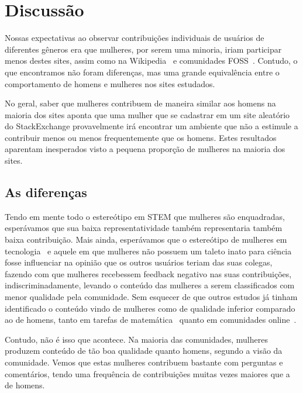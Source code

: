 \chapter{Discussão}

Nossas expectativas ao observar contribuições individuais de usuários de diferentes gêneros era que mulheres, por serem uma minoria, iriam participar menos destes sites, assim como na Wikipedia~\cite{antin2011gender} e comunidades FOSS~\cite{rustad2011suck}. Contudo, o que encontramos não foram diferenças, mas uma grande equivalência entre o comportamento de homens e mulheres nos sites estudados. 

No geral, saber que mulheres contribuem de maneira similar aos homens na maioria dos sites aponta que uma mulher que se cadastrar em um site aleatório do StackExchange provavelmente irá encontrar um ambiente que não a estimule a contribuir menos ou menos frequentemente que os homens. Estes resultados aparentam inesperados visto a pequena proporção de mulheres na maioria dos sites.

\section{As diferenças}

Tendo em mente todo o estereótipo em STEM que mulheres são enquadradas, esperávamos que sua baixa representatividade também representaria também baixa contribuição. Mais ainda, esperávamos que o estereótipo de mulheres em tecnologia~\cite{hyde1990gender} e aquele em que mulheres não possuem um taleto inato para ciência~\cite{leslie2015expectations} fosse influenciar na opinião que os outros usuários teriam das suas colegas, fazendo com que mulheres recebessem feedback negativo nas suas contribuições, indiscriminadamente, levando o conteúdo das mulheres a serem classificados com menor qualidade pela comunidade. Sem esquecer de que outros estudos já tinham identificado o conteúdo vindo de mulheres como de qualidade inferior comparado ao de homens, tanto em tarefas de matemática~\cite{campbell1986effects} quanto em comunidades online~\cite{collier2012conflict}.

Contudo, não é isso que acontece. Na maioria das comunidades, mulheres produzem conteúdo de tão boa qualidade quanto homens, segundo a visão da comunidade. Vemos que estas mulheres contribuem bastante com perguntas e comentários, tendo uma frequência de contribuições muitas vezes maiores que a de homens. 

